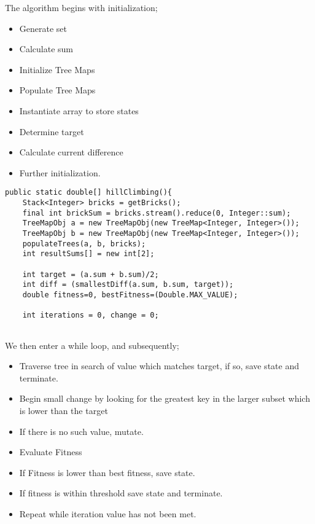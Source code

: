 \documentclass[a4paper]{article}
\begin{document}
\newpage

The algorithm begins with initialization; \\
\begin{itemize}
  \item Generate set
  \item Calculate sum
  \item Initialize Tree Maps
  \item Populate Tree Maps
  \item Instantiate array to store states
  \item Determine target 
  \item Calculate current difference 
  \item Further initialization.
\end{itemize} 
\vspace{8mm}

\begin{verbatim}
public static double[] hillClimbing(){
    Stack<Integer> bricks = getBricks();
    final int brickSum = bricks.stream().reduce(0, Integer::sum);
    TreeMapObj a = new TreeMapObj(new TreeMap<Integer, Integer>());
    TreeMapObj b = new TreeMapObj(new TreeMap<Integer, Integer>());
    populateTrees(a, b, bricks);
    int resultSums[] = new int[2];
  
    int target = (a.sum + b.sum)/2;
    int diff = (smallestDiff(a.sum, b.sum, target));
    double fitness=0, bestFitness=(Double.MAX_VALUE);

    int iterations = 0, change = 0;
    

\end{verbatim}


\newpage

\vspace*{-1cm} 
We then enter a while loop, and subsequently;
\vspace{2mm}
\begin{itemize}
  \item Traverse tree in search of value which matches target,
    if so, save state and terminate.
  \item Begin small change by looking for the greatest key in the larger subset 
    which is lower than the target  
  \item If there is no such value, mutate.
  \item Evaluate Fitness
  \item If Fitness is lower than best fitness, save state.
  \item If fitness is within threshold save state and terminate.
  \item Repeat while iteration value has not been met.
  
\end{itemize}
\end{document}
